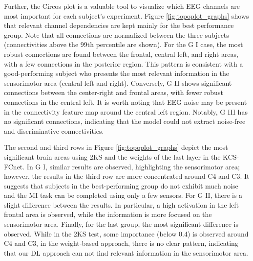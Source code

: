 Further, the Circos plot is a valuable tool to visualize which EEG channels are most important for each subject's experiment. Figure \ref{fig:topoplot_graphs} shows that relevant channel dependencies are kept mainly for the best performance group. Note that all connections are normalized between the three subjects (connectivities above the 99th percentile are shown). For the G I case, the most robust connections are found between the frontal, central left, and right areas, with a few connections in the posterior region. This pattern is consistent with a good-performing subject who presents the most relevant information in the sensorimotor area (central left and right).
Conversely, G II shows significant connections between the center-right and frontal areas, with fewer robust connections in the central left. It is worth noting that EEG noise may be present in the connectivity feature map around the central left region. Notably, G III has no significant connections, indicating that the model could not extract noise-free and discriminative connectivities.

The second and third rows in Figure \ref{fig:topoplot_graphs} depict the most significant brain areas using 2KS and the weights of the last layer in the KCS-FCnet. In G I, similar results are observed, highlighting the sensorimotor area; however, the results in the third row are more concentrated around C4 and C3. It suggests that subjects in the best-performing group do not exhibit much noise and the MI task can be completed using only a few sensors. For G II, there is a slight difference between the results. In particular, a high activation in the left frontal area is observed, while the information is more focused on the sensorimotor area. Finally, for the last group, the most significant difference is observed. While in the 2KS test, some importance (below 0.4) is observed around C4 and C3, in the weight-based approach, there is no clear pattern, indicating that our DL approach can not find relevant information in the sensorimotor area. 


